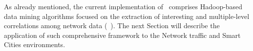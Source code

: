 As already mentioned, the current implementation of \Nemico\ comprises Hadoop-based data mining algorithms focused on the extraction of interesting and multiple-level correlations among network data (~\cite{ISPA14}). The next Section will describe the application of such comprehensive framework to the Network traffic and Smart Cities environments.


%
%

